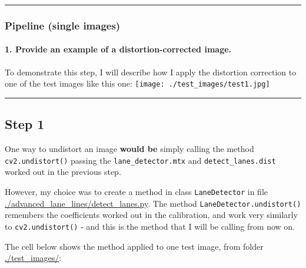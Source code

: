 \documentclass[11pt]{article}
\makeatletter
\def\maxwidth{\ifdim\Gin@nat@width>\linewidth\linewidth
    \else\Gin@nat@width\fi}
\let\Oldincludegraphics\includegraphics
\renewcommand{\includegraphics}[1]{\Oldincludegraphics[width=.8\maxwidth]{#1}}
\makeatother
\begin{document}
    \begin{center}\rule{0.5\linewidth}{\linethickness}\end{center}

\hypertarget{pipeline-single-images}{%
\subsubsection{Pipeline (single images)}\label{pipeline-single-images}}

\hypertarget{provide-an-example-of-a-distortion-corrected-image.}{%
\paragraph{1. Provide an example of a distortion-corrected
image.}\label{provide-an-example-of-a-distortion-corrected-image.}}

To demonstrate this step, I will describe how I apply the distortion
correction to one of the test images like this one:
\texttt{[image: ./test\_images/test1.jpg]}

    \begin{center}\rule{0.5\linewidth}{\linethickness}\end{center}

\hypertarget{step-1}{%
\subsection{Step 1}\label{step-1}}

One way to undistort an image \textbf{would be} simply calling the
method \texttt{cv2.undistort()} passing the \texttt{lane\_detector.mtx}
and \texttt{detect\_lanes.dist} worked out in the previous step.

However, my choice was to create a method in class \texttt{LaneDetector}
in file
\href{./advanced-lane-lines/detect-lanes.py}{./advanced\_lane\_lines/detect\_lanes.py}.
The method \texttt{LaneDetector.undistort()} remembers the coefficients
worked out in the calibration, and work very similarly to
\texttt{cv2.undistort()} - and this is the method that I will be calling
from now on.

The cell below shows the method applied to one test image, from folder
\href{./test_images}{./test\_images/}:
\end{document}
